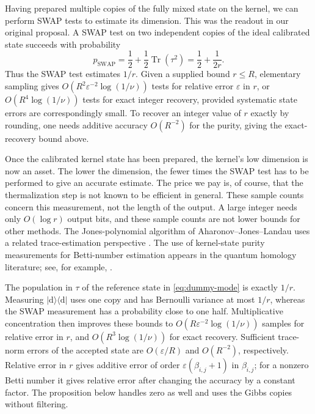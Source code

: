 \documentclass[a4paper,onecolumn,unpublished]{quantumarticle}
\theoremstyle{plain}
\theoremstyle{definition}
\theoremstyle{definition}
\numberwithin{equation}{section}
\begin{document}
Having prepared multiple copies of the fully mixed state on the kernel,
we can perform SWAP tests to estimate its dimension. This was the
readout in our original proposal. A SWAP test on two independent copies
of the ideal calibrated state succeeds with probability
\begin{equation}\label{eq:swap-reference-comparison}
 p_{\mathrm{SWAP}}
 =\frac12+\frac12\operatorname{Tr}(\tau^2)
 =\frac12+\frac{1}{2r}.
\end{equation}
Thus the SWAP test estimates $1/r$. Given a supplied bound $r\le R$,
elementary sampling gives
$O(R^2\varepsilon^{-2}\log(1/\nu))$ tests for relative error
$\varepsilon$ in $r$, or $O(R^4\log(1/\nu))$ tests for exact
integer recovery, provided systematic state errors are correspondingly
small. To recover an integer value of $r$ exactly by rounding, one
needs additive accuracy $O(R^{-2})$ for the purity, giving the
exact-recovery bound above.

Once the calibrated kernel state has been prepared, the kernel's low
dimension is now an asset. The lower the dimension, the fewer times the
SWAP test has to be performed to give an accurate estimate. The price
we pay is, of course, that the thermalization step is not known to be
efficient in general. These sample counts concern this measurement,
not the length of the output. A large integer needs only $O(\log r)$
output bits, and these sample counts are not lower bounds for other
methods. The Jones-polynomial algorithm of Aharonov--Jones--Landau uses
a related trace-estimation perspective \cite{Aharonov-Jones-Landau}.
The use of kernel-state purity measurements for Betti-number estimation
appears in the quantum homology literature; see, for example,
\cite{scali2024topology}.

The population in $\tau$ of the reference state in \cref{eq:dummy-mode} is exactly $1/r$.
Measuring $|\mathrm d\rangle\!\langle\mathrm d|$ uses one copy
and has Bernoulli variance at most $1/r$, whereas the SWAP
measurement has a probability close to one half.
Multiplicative concentration then improves these bounds to
$O(R\varepsilon^{-2}\log(1/\nu))$ samples for relative error
in $r$, and $O(R^3\log(1/\nu))$ for exact recovery.
Sufficient trace-norm errors of the accepted state are
$O(\varepsilon/R)$ and $O(R^{-2})$, respectively.
Relative error in $r$ gives additive error of order
$\varepsilon(\beta_{i,j}+1)$ in $\beta_{i,j}$;
for a nonzero Betti number it gives relative error after changing
the accuracy by a constant factor. The proposition below handles
zero as well and uses the Gibbs copies without filtering.
\end{document}

